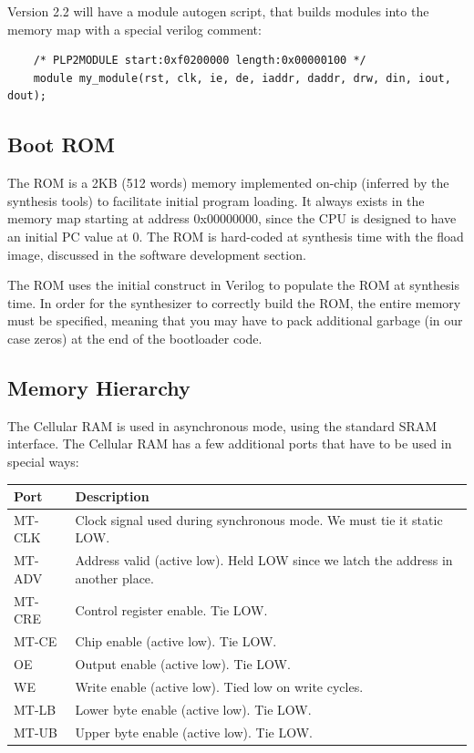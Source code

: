 \documentclass{article}
\begin{document}
Version 2.2 will have a module autogen script, that builds modules into the memory map with a special verilog comment:

\begin{verbatim}
	/* PLP2MODULE start:0xf0200000 length:0x00000100 */
	module my_module(rst, clk, ie, de, iaddr, daddr, drw, din, iout, dout);
\end{verbatim}

\subsection{Boot ROM}
The ROM is a 2KB (512 words) memory implemented on-chip (inferred by the synthesis tools) to facilitate initial program loading. It always exists in the memory map starting at address 0x00000000, since the CPU is designed to have an initial PC value at 0. The ROM is hard-coded at synthesis time with the fload image, discussed in the software development section.

The ROM uses the initial construct in Verilog to populate the ROM at synthesis time. In order for the synthesizer to correctly build the ROM, the entire memory must be specified, meaning that you may have to pack additional garbage (in our case zeros) at the end of the bootloader code.

\subsection{Memory Hierarchy}

The Cellular RAM is used in asynchronous mode, using the standard SRAM interface. The Cellular RAM has a few additional ports that have to be used in special ways:

\begin{tabular}{|l|l|}
 \hline
 
 \textbf{Port}&   \textbf{Description} 								\\ \hline
 MT-CLK       & Clock signal used during synchronous mode. We must tie it static LOW.\\ \hline
 MT-ADV	      & Address valid (active low). Held LOW since we latch the address in another place. \\ \hline
 MT-CRE       & Control register enable. Tie LOW. \\ \hline
 MT-CE        & Chip enable (active low). Tie LOW.\\ \hline
 OE           & Output enable (active low). Tie LOW.\\ \hline
 WE           & Write enable (active low). Tied low on write cycles.\\ \hline
 MT-LB        & Lower byte enable (active low). Tie LOW.\\ \hline
 MT-UB        & Upper byte enable (active low). Tie LOW.\\ \hline
\end{tabular}
\end{document}
